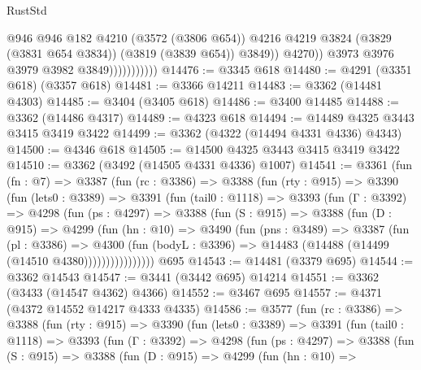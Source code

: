 \begin{lexlean}{RustStd}
\begin{coremodule}
                                  @946
                                  @946
                                  @182
                                  @4210
                                  (@3572 (@3806 @654))
                                  @4216
                                  @4219
                                  @3824
                                  (@3829 (@3831 @654 @3834))
                                  (@3819 (@3839 @654))
                                  @3849))
                              @4270))
                          @3973
                          @3976
                          @3979
                          @3982
                          @3849)))))))))))
@14476 := @3345 @618
@14480 := @4291 (@3351 @618) (@3357 @618)
@14481 := @3366 @14211
@14483 := @3362 (@14481 @4303)
@14485 := @3404 (@3405 @618)
@14486 := @3400 @14485
@14488 := @3362 (@14486 @4317)
@14489 := @4323 @618
@14494 := @14489 @4325 @3443 @3415 @3419 @3422
@14499 := @3362 (@4322 (@14494 @4331 @4336) @4343)
@14500 := @4346 @618
@14505 := @14500 @4325 @3443 @3415 @3419 @3422
@14510 := @3362 (@3492 (@14505 @4331 @4336) @1007)
@14541 := @3361
    (fun (fn : @7) =>
    @3387
      (fun (rc : @3386) =>
      @3388
        (fun (rty : @915) =>
        @3390
          (fun (lets0 : @3389) =>
          @3391
            (fun (tail0 : @1118) =>
            @3393
              (fun (Γ : @3392) =>
              @4298
                (fun (ps : @4297) =>
                @3388
                  (fun (S : @915) =>
                  @3388
                    (fun (D : @915) =>
                    @4299
                      (fun (hn : @10) =>
                      @3490
                        (fun (pns : @3489) =>
                        @3387
                          (fun (pl : @3386) =>
                          @4300
                            (fun (bodyL : @3396) =>
                            @14483 (@14488 (@14499 (@14510 @4380))))))))))))))))
    @695
@14543 := @14481 (@3379 @695)
@14544 := @3362 @14543
@14547 := @3441 (@3442 @695) @14214
@14551 := @3362 (@3433 (@14547 @4362) @4366)
@14552 := @3467 @695
@14557 := @4371 (@4372 @14552 @14217 @4333 @4335)
@14586 := @3577
    (fun (rc : @3386) =>
    @3388
      (fun (rty : @915) =>
      @3390
        (fun (lets0 : @3389) =>
        @3391
          (fun (tail0 : @1118) =>
          @3393
            (fun (Γ : @3392) =>
            @4298
              (fun (ps : @4297) =>
              @3388
                (fun (S : @915) =>
                @3388
                  (fun (D : @915) =>
                  @4299
                    (fun (hn : @10) =>

\end{coremodule}
\end{lexlean}
